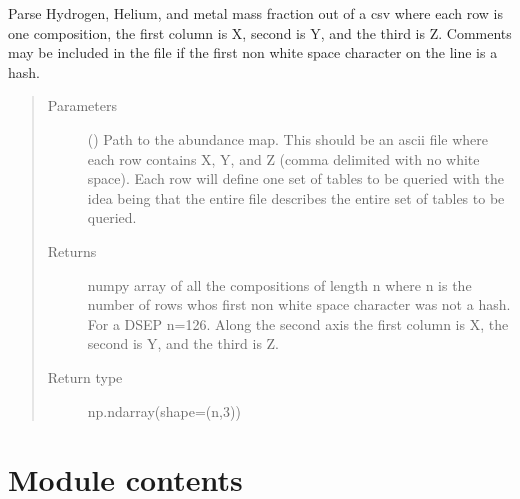 \documentclass[letterpaper,10pt,english]{sphinxmanual}
\begin{document}
\begin{fulllineitems}
\label{\detokenize{pyTOPSScrape.parse:pyTOPSScrape.parse.abundance.parse_abundance_map}}
\sphinxAtStartPar
Parse Hydrogen, Helium, and metal mass fraction out of a csv where each row
is one composition, the first column is X, second is Y, and the third is Z.
Comments may be included in the file if the first non white space character
on the line is a hash.
\begin{quote}\begin{description}
\item[{Parameters}] \leavevmode
\sphinxAtStartPar
{} () \textendash{} Path to the abundance map. This should be an ascii file where each
row contains X, Y, and Z (comma delimited with no white space).
Each row will define one set of tables to be queried with the idea
being that the entire file describes the entire set of tables to
be queried.

\item[{Returns}] \leavevmode
\sphinxAtStartPar
{} \textendash{} numpy array of all the compositions of length n where n is the
number of rows whos first non white space character was not a hash.
For a DSEP n=126. Along the second axis the first column is X, the
second is Y, and the third is Z.

\item[{Return type}] \leavevmode
\sphinxAtStartPar
np.ndarray(shape=(n,3))

\end{description}\end{quote}

\end{fulllineitems}



\section{Module contents}
\label{\detokenize{pyTOPSScrape.parse:module-pyTOPSScrape.parse}}\label{\detokenize{pyTOPSScrape.parse:module-contents}}
\end{document}
